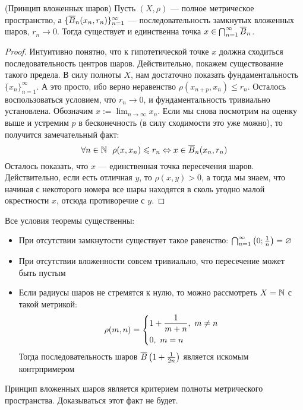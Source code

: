 \begin{theorem} (Принцип вложенных шаров)
	Пусть $(X, \rho)$ --- полное метрическое пространство, а $\{\overline{B}_n(x_n, r_n)\}_{n = 1}^\infty$ --- последовательность замкнутых вложенных шаров, $r_n \to 0$. Тогда существует и единственна точка $x \in \bigcap_{n = 1}^\infty \overline{B}_n$.
\end{theorem}

\begin{proof}
	Интуитивно понятно, что к гипотетической точке $x$ должна сходиться последовательность центров шаров. Действительно, покажем существование такого предела. В силу полноты $X$, нам достаточно показать фундаментальность $\{x_n\}_{n = 1}^\infty$. А это просто, ибо верно неравенство $\rho(x_{n + p}, x_n) \le r_n$. Осталось воспользоваться условием, что $r_n \to 0$, и фундаментальность тривиально установлена. Обозначим $x := \lim_{n \to \infty} x_n$. Если мы снова посмотрим на оценку выше и устремим $p$ в бесконечность (в силу сходимости это уже можно), то получится замечательный факт:
	\[
		\forall n \in \N\ \ \rho(x, x_n) \le r_n \Lra x \in \ole{B}_n(x_n, r_n)
	\]
	Осталось показать, что $x$ --- единственная точка пересечения шаров. Действительно, если есть отличная $y$, то $\rho(x, y) > 0$, а тогда мы знаем, что начиная с некоторого номера все шары находятся в сколь угодно малой окрестности $x$, отсюда противоречие с $y$.
\end{proof}

\begin{note}
	Все условия теоремы существенны:
	\begin{itemize}
		\item При отсутствии замкнутости существует такое равенство: $\bigcap_{n = 1}^\infty \left(0; \frac{1}{n}\right) = \varnothing$
		
		\item При отсутствии вложенности совсем тривиально, что пересечение может быть пустым
		
		\item Если радиусы шаров не стремятся к нулю, то можно рассмотреть $X = \mathbb{N}$ с такой метрикой:
		\[
			\rho(m, n) = \left\{ \begin{aligned} 
				&{1 + \frac{1}{m + n},\ m \neq n}
				\\
				&{0,\ m = n}
			 \end{aligned} \right.
		\]
		Тогда последовательность шаров $\overline{B}\left(1 + \frac{1}{2n}\right)$ является искомым контрпримером
	\end{itemize}
\end{note}

\begin{note}
	Принцип вложенных шаров является критерием полноты метрического пространства. Доказываться этот факт не будет.
\end{note}

